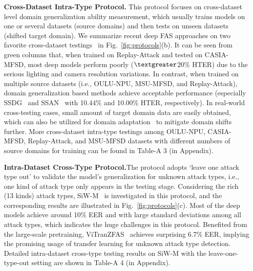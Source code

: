 \documentclass[10pt,journal,compsoc]{IEEEtran}
\begin{document}
\noindent\textbf{Cross-Dataset Intra-Type Protocol.}\quad 
This protocol focuses on cross-dataset level domain generalization ability measurement, which usually trains models on one or several datasets (source domains) and then tests on unseen datasets (shifted target domain). We summarize recent deep FAS approaches on two favorite cross-dataset testings~\cite{yu2020searching,shao2019multi} in Fig.~\ref{fig:protocols}(b). It can be seen from green columns that, when trained on Replay-Attack and tested on CASIA-MFSD, most deep models perform poorly ($\textgreater$20\% HTER) due to the serious lighting and camera resolution variations. In contrast, when trained on multiple source datasets (i.e., OULU-NPU, MSU-MFSD, and Replay-Attack), domain generalization based methods achieve acceptable performance (especially SSDG~\cite{jia2020single} and SSAN~\cite{wang2022domain} with 10.44\% and 10.00\% HTER, respectively). In real-world cross-testing cases, small amount of target domain data are easily obtained, which can also be utilized for domain adaptation~\cite{jia2021unified} to mitigate domain shifts further. More cross-dataset intra-type testings among OULU-NPU, CASIA-MFSD, Replay-Attack, and MSU-MFSD datasets with different numbers of source domains for training can be found in Table-A 3 (in Appendix).  

\vspace{0.3em}

\noindent\textbf{Intra-Dataset Cross-Type Protocol.}\quad  The protocol adopts `leave one attack type out' to validate the model's generalization for unknown attack types, i.e., one kind of attack type only appears in the testing stage. Considering the rich (13 kinds) attack types, SiW-M~\cite{liu2019deep} is investigated in this protocol, and the corresponding results are illustrated in Fig.~\ref{fig:protocols}(c). Most of the deep models achieve around 10\% EER and with large standard deviations among all attack types, which indicates the huge challenges in this protocol. Benefited from the large-scale pretraining, ViTranZFAS~\cite{liu2019deep} achieves surprising 6.7\% EER, implying the promising usage of transfer learning for unknown attack type detection. Detailed intra-dataset cross-type testing results on SiW-M with the leave-one-type-out setting are shown in Table-A 4 (in Appendix).   



\vspace{0.4em}
\end{document}
